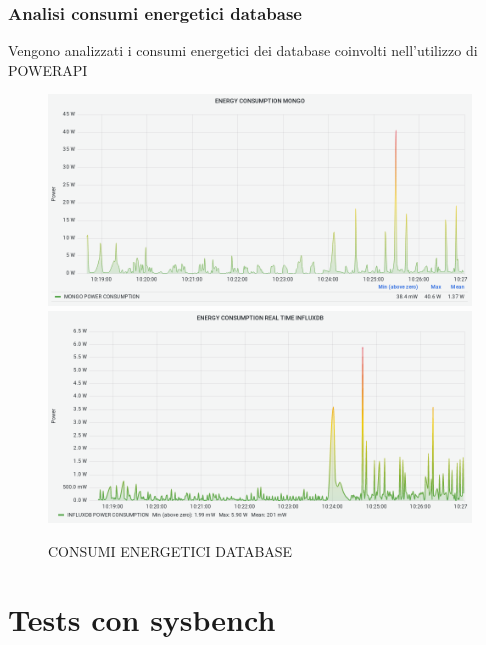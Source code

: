 \documentclass[a4paper, 11pt]{article}
\begin{document}
\subsubsection{Analisi consumi energetici database}
\begin{flushleft}
{Vengono analizzati i consumi energetici dei database coinvolti nell'utilizzo di POWERAPI}
\end{flushleft}
\begin{figure}[h]
\caption{CONSUMI ENERGETICI DATABASE}
\centering
\includegraphics[scale=0.4]{image4}
\includegraphics[scale=0.4]{image7}
\end{figure}

\clearpage
\section{Tests con sysbench}
\end{document}
